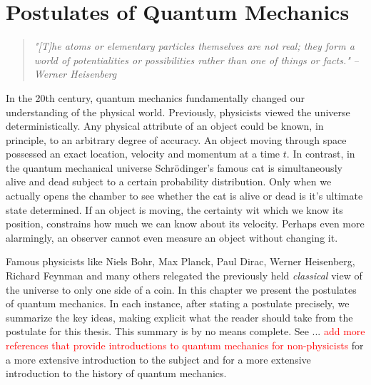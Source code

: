 
\chapter{Postulates of Quantum Mechanics} %

\label{Chapter3-postulates} %

\begin{quote}
\textit{"[T]he atoms or elementary particles themselves are not real; they form a world of potentialities or possibilities rather than one of things or facts."}
\bigskip
\hfill \textit{--Werner Heisenberg}
\end{quote}

In the 20th century, quantum mechanics fundamentally changed our understanding of the physical world.  Previously, physicists viewed the universe deterministically.  Any physical attribute of an object could be known, in principle, to an arbitrary degree of accuracy.  An object moving through space possessed an exact location, velocity and momentum at a time $t$. In contrast, in the quantum mechanical universe Schrödinger's famous cat is simultaneously alive and dead subject to a certain probability distribution.  Only when we actually opens the chamber to see whether the cat is alive or dead is it's ultimate state determined. If an object is moving, the certainty wit which we know its position, constrains how much we can know about its velocity.  Perhaps even more alarmingly, an observer cannot even measure an object without changing it.

Famous physicists like Niels Bohr, Max Planck, Paul Dirac, Werner Heisenberg, Richard Feynman and many others relegated the previously held {\emph{classical}} view of the universe to only one side of a coin.  In this chapter we present the postulates of quantum mechanics.  In each instance, after stating a postulate precisely, we summarize the key ideas, making explicit what the reader should take from the postulate for this thesis.  This summary is by no means complete.  See ... \textcolor{red}{add more references that provide introductions to quantum mechanics for non-physicists} for a more extensive introduction to the subject and \cite{dorai2018} for a more extensive introduction to the history of quantum mechanics.

\pagebreak
